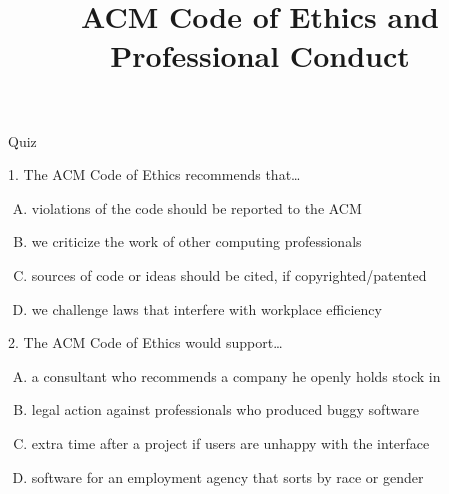 \documentclass{beamer}
\title[ACM Code]{ACM Code of Ethics and Professional Conduct}
\date{}
\begin{document}
\begin{frame}
\titlepage
\end{frame}

\begin{frame}{Quiz}
\begin{block}{1. The ACM Code of Ethics recommends that\ldots}
\begin{enumerate}[(A)]
\item<1> violations of the code should be reported to the ACM
\item<1-3> we criticize the work of other computing professionals
\item<1> sources of code or ideas should be cited, if copyrighted/patented
\item<1> we challenge laws that interfere with workplace efficiency
\end{enumerate}
\end{block}
\begin{block}{2. The ACM Code of Ethics would support\ldots}
\begin{enumerate}[(A)]
\item<1-3> a consultant who recommends a company he openly holds stock in
\item<1-2> legal action against professionals who produced buggy software
\item<1-2> extra time after a project if users are unhappy with the interface
\item<1-2> software for an employment agency that sorts by race or gender
\end{enumerate}
\end{block}
\end{frame}
\end{document}
